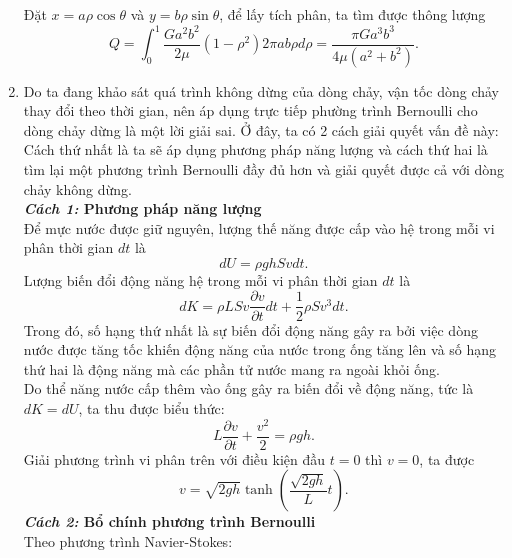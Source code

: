 \begin{enumerate}
\begin{equation}
    \end{equation}
    Đặt $x=a \rho \cos \theta$ và $y=b \rho \sin \theta$, để lấy tích phân, ta tìm được thông lượng
    \begin{equation} \label{eq8_flow}
        Q = \int_0^1 \dfrac{G a^2 b^2}{2\mu} \left( 1 - \rho^2 \right) 2 \pi ab \rho d \rho 
        = \dfrac{\pi G a^3 b^3}{4 \mu \left( a^2 + b^2 \right)}.
    \end{equation}
    \item Do ta đang khảo sát quá trình không dừng của dòng chảy, vận tốc dòng chảy thay đổi theo thời gian, nên áp dụng trực tiếp phường trình Bernoulli cho dòng chảy dừng là một lời giải sai. Ở đây, ta có 2 cách giải quyết vấn đề này: Cách thứ nhất là ta sẽ áp dụng phương pháp năng lượng và cách thứ hai là tìm lại một phương trình Bernoulli đầy đủ hơn và giải quyết được cả với dòng chảy không dừng. \\
    \textbf{\textit{Cách 1:} Phương pháp năng lượng}\\
    Để mực nước được giữ nguyên, lượng thế năng được cấp vào hệ trong mỗi vi phân thời gian $dt$ là
    \begin{equation} \label{eq9_flow}
        dU = \rho g h S v dt.
    \end{equation}
    Lượng biến đổi động năng hệ trong mỗi vi phân thời gian $dt$ là
    \begin{equation} \label{eq10_flow}
        dK = \rho L S v \dfrac{\partial v}{\partial t} dt + \dfrac{1}{2} \rho S v^3 dt.
    \end{equation}
    Trong đó, số hạng thứ nhất là sự biến đổi động năng gây ra bởi việc dòng nước được tăng tốc khiến động năng của nước trong ống tăng lên và số hạng thứ hai là động năng mà các phần tử nước mang ra ngoài khỏi ống. \\
    Do thể năng nước cấp thêm vào ống gây ra biến đổi về động năng, tức là $dK=dU$, ta thu được biểu thức:
    \begin{equation} \label{eq11_flow}
        L \dfrac{\partial v}{\partial t} + \dfrac{v^2}{2} = \rho g h.
    \end{equation}
    Giải phương trình vi phân trên với điều kiện đầu $t=0$ thì $v=0$, ta được
    \begin{equation} \label{eq12_flow}
        v = \sqrt{2gh} \tanh \left( \dfrac{\sqrt{2gh}}{L} t \right).
    \end{equation}
    \textbf{\textit{Cách 2:} Bổ chính phương trình Bernoulli}\\
    Theo phương trình Navier-Stokes:
    \begin{equation} \label{eq13_flow}

\end{equation}
\end{enumerate}
